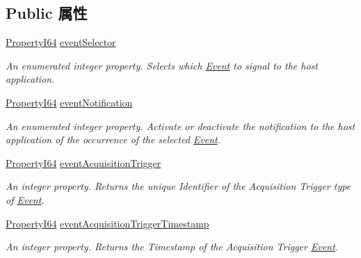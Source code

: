 \subsection*{Public 属性}
\begin{DoxyCompactItemize}
\item 
\hyperlink{group___common_interface_ga81749b2696755513663492664a18a893}{Property\+I64} \hyperlink{classmv_i_m_p_a_c_t_1_1acquire_1_1_gen_i_cam_1_1_event_control_a1c19b680c25b8c3f179e74ebc668245d}{event\+Selector}
\begin{DoxyCompactList}\small\item\em An enumerated integer property. Selects which \hyperlink{classmv_i_m_p_a_c_t_1_1acquire_1_1_event}{Event} to signal to the host application. \end{DoxyCompactList}\item 
\hyperlink{group___common_interface_ga81749b2696755513663492664a18a893}{Property\+I64} \hyperlink{classmv_i_m_p_a_c_t_1_1acquire_1_1_gen_i_cam_1_1_event_control_aba510fcef5cb7a59847557a472452ca1}{event\+Notification}
\begin{DoxyCompactList}\small\item\em An enumerated integer property. Activate or deactivate the notification to the host application of the occurrence of the selected \hyperlink{classmv_i_m_p_a_c_t_1_1acquire_1_1_event}{Event}. \end{DoxyCompactList}\item 
\hyperlink{group___common_interface_ga81749b2696755513663492664a18a893}{Property\+I64} \hyperlink{classmv_i_m_p_a_c_t_1_1acquire_1_1_gen_i_cam_1_1_event_control_ae8d212f2295c76df79d0d83b08382520}{event\+Acquisition\+Trigger}
\begin{DoxyCompactList}\small\item\em An integer property. Returns the unique Identifier of the Acquisition Trigger type of \hyperlink{classmv_i_m_p_a_c_t_1_1acquire_1_1_event}{Event}. \end{DoxyCompactList}\item 
\hyperlink{group___common_interface_ga81749b2696755513663492664a18a893}{Property\+I64} \hyperlink{classmv_i_m_p_a_c_t_1_1acquire_1_1_gen_i_cam_1_1_event_control_a5caef4334291b2db71faaa2a06949d3b}{event\+Acquisition\+Trigger\+Timestamp}
\begin{DoxyCompactList}\small\item\em An integer property. Returns the Timestamp of the Acquisition Trigger \hyperlink{classmv_i_m_p_a_c_t_1_1acquire_1_1_event}{Event}. \end{DoxyCompactList}\item 

\end{DoxyCompactItemize}
